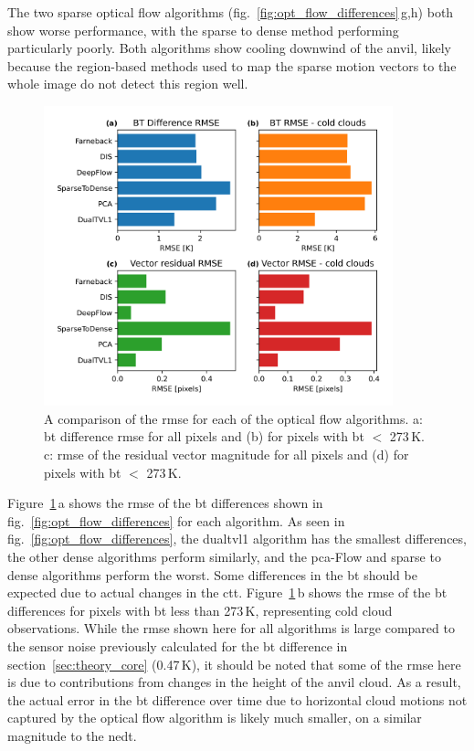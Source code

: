 The two sparse optical flow algorithms (fig.~\ref{fig:opt_flow_differences}\,g,h) both show worse performance, with the sparse to dense method performing particularly poorly.
Both algorithms show cooling downwind of the anvil, likely because the region-based methods used to map the sparse motion vectors to the whole image do not detect this region well.

\begin{figure}[tp]
    \includegraphics[width=0.9\textwidth]{figures/chapter1_12.png}
    \caption[
    A comparison of the \acrshort{bt} difference and residual vector magnitude \acrshort{rmse} for each of the optical flow algorithms
    ]{
    A comparison of the \acrshort{rmse} for each of the optical flow algorithms. a: \acrshort{bt} difference \acrshort{rmse} for all pixels and (b) for pixels with \acrshort{bt} $<$ 273\,\unit{K}. c: \acrshort{rmse} of the residual vector magnitude for all pixels and (d) for pixels with \acrshort{bt} $<$ 273\,\unit{K}.
    }
    \label{fig:opt_flow_mse}
\end{figure}

Figure~\ref{fig:opt_flow_mse}\,a shows the \acrfull{rmse} of the \acrshort{bt} differences shown in fig.~\ref{fig:opt_flow_differences} for each algorithm.
As seen in fig.~\ref{fig:opt_flow_differences}, the \acrshort{dualtvl1} algorithm has the smallest differences, the other dense algorithms perform similarly, and the \acrshort{pca}-Flow and sparse to dense algorithms perform the worst.
Some differences in the \acrshort{bt} should be expected due to actual changes in the \acrshort{ctt}.
Figure~\ref{fig:opt_flow_mse}\,b shows the \acrshort{rmse} of the \acrshort{bt} differences for pixels with \acrshort{bt} less than 273\,\unit{K}, representing cold cloud observations.
While the \acrshort{rmse} shown here for all algorithms is large compared to the sensor noise previously calculated for the \acrshort{bt} difference in section~\ref{sec:theory_core} (0.47\,K), it should be noted that some of the \acrshort{rmse} here is due to contributions from changes in the height of the anvil cloud.
As a result, the actual error in the \acrshort{bt} difference over time due to horizontal cloud motions not captured by the optical flow algorithm is likely much smaller, on a similar magnitude to the \acrshort{nedt}.

